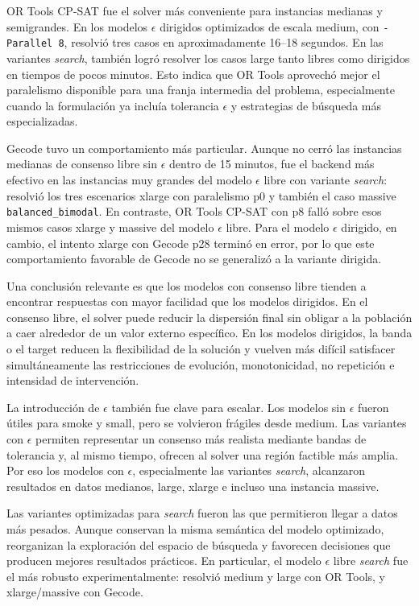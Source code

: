 \documentclass[10pt,letterpaper]{article}
\begin{document}
OR Tools CP-SAT fue el solver m\'as conveniente para instancias medianas y semigrandes. En los modelos \(\epsilon\) dirigidos optimizados de escala medium, con \texttt{-Parallel 8}, resolvi\'o tres casos en aproximadamente 16--18 segundos. En las variantes \textit{search}, tambi\'en logr\'o resolver los casos large tanto libres como dirigidos en tiempos de pocos minutos. Esto indica que OR Tools aprovech\'o mejor el paralelismo disponible para una franja intermedia del problema, especialmente cuando la formulaci\'on ya inclu\'ia tolerancia \(\epsilon\) y estrategias de b\'usqueda m\'as especializadas.

Gecode tuvo un comportamiento m\'as particular. Aunque no cerr\'o las instancias medianas de consenso libre sin \(\epsilon\) dentro de 15 minutos, fue el backend m\'as efectivo en las instancias muy grandes del modelo \(\epsilon\) libre con variante \textit{search}: resolvi\'o los tres escenarios xlarge con paralelismo p0 y tambi\'en el caso massive \texttt{balanced\_bimodal}. En contraste, OR Tools CP-SAT con p8 fall\'o sobre esos mismos casos xlarge y massive del modelo \(\epsilon\) libre. Para el modelo \(\epsilon\) dirigido, en cambio, el intento xlarge con Gecode p28 termin\'o en error, por lo que este comportamiento favorable de Gecode no se generaliz\'o a la variante dirigida.

Una conclusi\'on relevante es que los modelos con consenso libre tienden a encontrar respuestas con mayor facilidad que los modelos dirigidos. En el consenso libre, el solver puede reducir la dispersi\'on final sin obligar a la poblaci\'on a caer alrededor de un valor externo espec\'ifico. En los modelos dirigidos, la banda o el target reducen la flexibilidad de la soluci\'on y vuelven m\'as dif\'icil satisfacer simult\'aneamente las restricciones de evoluci\'on, monotonicidad, no repetici\'on e intensidad de intervenci\'on.

La introducci\'on de \(\epsilon\) tambi\'en fue clave para escalar. Los modelos sin \(\epsilon\) fueron \'utiles para smoke y small, pero se volvieron fr\'agiles desde medium. Las variantes con \(\epsilon\) permiten representar un consenso m\'as realista mediante bandas de tolerancia y, al mismo tiempo, ofrecen al solver una regi\'on factible m\'as amplia. Por eso los modelos con \(\epsilon\), especialmente las variantes \textit{search}, alcanzaron resultados en datos medianos, large, xlarge e incluso una instancia massive.

Las variantes optimizadas para \textit{search} fueron las que permitieron llegar a datos m\'as pesados. Aunque conservan la misma sem\'antica del modelo optimizado, reorganizan la exploraci\'on del espacio de b\'usqueda y favorecen decisiones que producen mejores resultados pr\'acticos. En particular, el modelo \(\epsilon\) libre \textit{search} fue el m\'as robusto experimentalmente: resolvi\'o medium y large con OR Tools, y xlarge/massive con Gecode.
\end{document}
